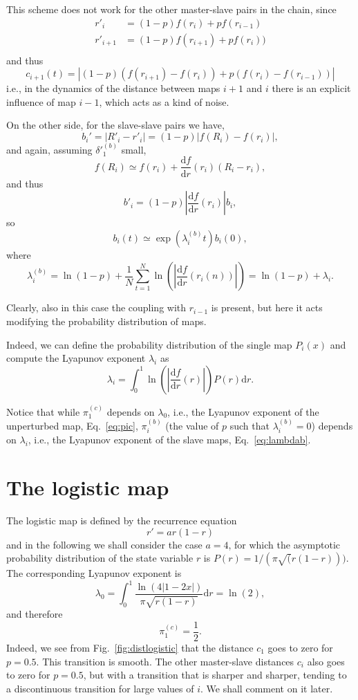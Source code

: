 \documentclass[runningheads]{llncs}
\begin{document}
This scheme does not work for the other master-slave pairs in the chain, since
\[
  \begin{split}
    r'_i &= (1-p) f(r_i) + p f(r_{i-1})\\
    r'_{i+1} &= (1-p) f(r_{i+1}) + p f(r_i))\\
  \end{split}
\]
and thus 
\[
  c_{i+1}(t) = \left|(1-p) (f(r_{i+1})-f(r_i)) + p (f(r_i)-f(r_{i-1}))\right|
\]
i.e., in the dynamics of the distance between maps $i+1$ and $i$ there is an explicit influence of map $i-1$, which acts as a kind of noise.    


On the other side, for the slave-slave pairs we have, 
\[
  b_i' = \left|R'_i-r'_{i}\right| = (1-p) \left|f(R_i) - f(r_{i})\right|,
\]
and again, assuming $\delta'^{(b)}_1$ small,
\[
f(R_{i})\simeq f(r_i) + \frac{\mathrm{d}{f}}{\mathrm{d}r}(r_i)(R_i-r_i),
\]
and thus
\[
  b'_i =  (1-p) \left|\frac{\mathrm{d}{f}}{\mathrm{d}r}(r_{i})\right|b_i,
\]
so  
\[
  b_i (t) \simeq  \exp(\lambda^{(b)}_i t)b_i(0),
\]
where 
\begin{equation}\label{eq:lambdab}
\lambda^{(b)}_i = \ln(1-p) + \frac{1}{N} \sum_{t=1}^N \ln\left(\left|\frac{\mathrm{d}{f}}{\mathrm{d}r}(r_{i}(n))\right|\right)= \ln(1-p) + \lambda_{i}.
\end{equation}

Clearly, also in this case the coupling with $r_{i-1}$ is present, but here it acts modifying the probability distribution of maps. 

Indeed, we can define the probability distribution of the single map $P_i(x)$ and compute the Lyapunov exponent $\lambda_i$ as
\begin{equation}\label{eq:lyapprob}
    \lambda_i = \int_0^1 \ln\left(\left|\frac{\mathrm{d}f}{\mathrm{d}r}(r)\right|\right) P(r)\mathrm{d}r.
\end{equation}

Notice that while $\pi^{(c)}_1$ depends on $\lambda_0$, i.e., the Lyapunov exponent of the unperturbed map, Eq.~\eqref{eq:pic}, $\pi^{(b)}_i$ (the value of $p$ such that $\lambda_i^{(b)}=0$) depends on $\lambda_i$, i.e., the Lyapunov exponent of the slave maps, Eq.~\eqref{eq:lambdab}.


\section{The logistic map}\label{sec:logistic}

The logistic map is defined by the recurrence equation 
\[
    r'=ar(1-r)
\]
and in the following we shall consider the case $a=4$, for which the asymptotic probability distribution of the state variable $r$ is $P(r) = 1/(\pi \sqrt(r(1-r)))$. The corresponding Lyapunov exponent is
\[
    \lambda_0 = \int_0^1 \frac{\ln(4|1-2x|)}{\pi \sqrt{r(1-r)}} \mathrm{d} r=\ln(2),
\]
and therefore
\[
    \pi^{(c)}_1=\frac{1}{2}.
\]
Indeed, we see from Fig.~\ref{fig:distlogistic} that the distance $c_1$ goes to zero for $p=0.5$. This transition is smooth. The other master-slave distances $c_i$ also goes to zero for $p=0.5$, but with a transition that is sharper and sharper, tending to a discontinuous transition for large values of $i$. We shall comment on it later. 
\end{document}
